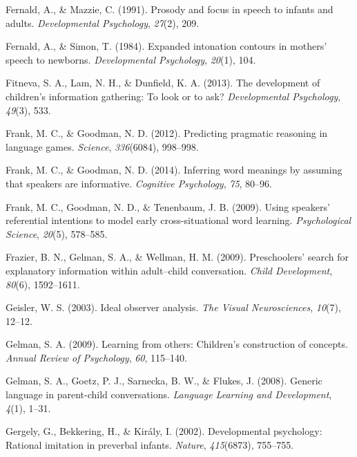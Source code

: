 \documentclass[english,floatsintext,man]{apa6}
\theoremstyle{definition}
\theoremstyle{definition}
\theoremstyle{definition}
\theoremstyle{remark}
\begin{document}
\hypertarget{ref-fernald1991prosody}{}
Fernald, A., \& Mazzie, C. (1991). Prosody and focus in speech to
infants and adults. \emph{Developmental Psychology}, \emph{27}(2), 209.

\hypertarget{ref-fernald1984expanded}{}
Fernald, A., \& Simon, T. (1984). Expanded intonation contours in
mothers' speech to newborns. \emph{Developmental Psychology},
\emph{20}(1), 104.

\hypertarget{ref-fitneva2013development}{}
Fitneva, S. A., Lam, N. H., \& Dunfield, K. A. (2013). The development
of children's information gathering: To look or to ask?
\emph{Developmental Psychology}, \emph{49}(3), 533.

\hypertarget{ref-frank2012predicting}{}
Frank, M. C., \& Goodman, N. D. (2012). Predicting pragmatic reasoning
in language games. \emph{Science}, \emph{336}(6084), 998--998.

\hypertarget{ref-frank2014inferring}{}
Frank, M. C., \& Goodman, N. D. (2014). Inferring word meanings by
assuming that speakers are informative. \emph{Cognitive Psychology},
\emph{75}, 80--96.

\hypertarget{ref-frank2009using}{}
Frank, M. C., Goodman, N. D., \& Tenenbaum, J. B. (2009). Using
speakers' referential intentions to model early cross-situational word
learning. \emph{Psychological Science}, \emph{20}(5), 578--585.

\hypertarget{ref-frazier2009preschoolers}{}
Frazier, B. N., Gelman, S. A., \& Wellman, H. M. (2009). Preschoolers'
search for explanatory information within adult--child conversation.
\emph{Child Development}, \emph{80}(6), 1592--1611.

\hypertarget{ref-geisler2003ideal}{}
Geisler, W. S. (2003). Ideal observer analysis. \emph{The Visual
Neurosciences}, \emph{10}(7), 12--12.

\hypertarget{ref-gelman2009learning}{}
Gelman, S. A. (2009). Learning from others: Children's construction of
concepts. \emph{Annual Review of Psychology}, \emph{60}, 115--140.

\hypertarget{ref-gelman2008generic}{}
Gelman, S. A., Goetz, P. J., Sarnecka, B. W., \& Flukes, J. (2008).
Generic language in parent-child conversations. \emph{Language Learning
and Development}, \emph{4}(1), 1--31.

\hypertarget{ref-gergely2002developmental}{}
Gergely, G., Bekkering, H., \& Király, I. (2002). Developmental
psychology: Rational imitation in preverbal infants. \emph{Nature},
\emph{415}(6873), 755--755.
\end{document}
